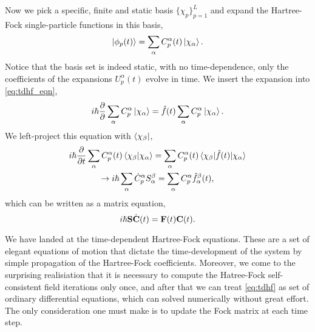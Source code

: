 Now we pick a specific, finite and static basis $\{\chi_p\}_{p=1}^{L}$ and expand the Hartree-Fock single-particle
functions in this basis,
\begin{equation}
    \ket{\phi_p(t)} = \sum_\alpha C^\alpha_p(t) \ket{\chi_\alpha}.
\end{equation}
Notice that the basis set is indeed static, with no time-dependence, only the coefficients 
of the expansions $U^\alpha_p(t)$ evolve in time.  
We insert the expansion into \autoref{eq:tdhf_eqn},
\begin{equation}
    i\hbar\frac{\partial}{\partial}\sum_\alpha C^\alpha_p \ket{\chi_\alpha} = \hat{f}(t)\sum_\alpha C^\alpha_p \ket{\chi_\alpha}.
\end{equation}
We left-project this equation with $\bra{\chi_\beta}$,
\begin{equation}
    \begin{gathered}
    i\hbar\frac{\partial}{\partial t} \sum_\alpha C^\alpha_p(t)\braket{\chi_\beta}{\chi_\alpha}
        = \sum_\alpha C^\alpha_p(t) \mel{\chi_\beta}{\hat{f}(t)}{\chi_\alpha}  \\
    \to i\hbar \sum_\alpha \dot{C}^\alpha_p S^\beta_\alpha = \sum_\alpha C^\alpha_p\hat{f}^\beta_\alpha(t),
    \end{gathered}
\end{equation}
which can be written as a matrix equation,
\begin{equation}
    \label{eq:tdhf}
    i\hbar \vb{S}\dot{\vb{C}}(t) = \vb{F}(t)\vb{C}(t).
\end{equation}

We have landed at the time-dependent Hartree-Fock equations. These 
are a set of elegant equations of motion that dictate
the time-development of 
the system by simple propagation of the Hartree-Fock coefficients. 
Moreover, we come to the surprising realisiation that it is necessary 
to compute the Hatree-Fock self-consistent field iterations only once, 
and after that we can treat \autoref{eq:tdhf} as set of ordinary 
differential equations, which can solved numerically without great 
effort. The only consideration 
one must make is to update the Fock matrix at each time step.